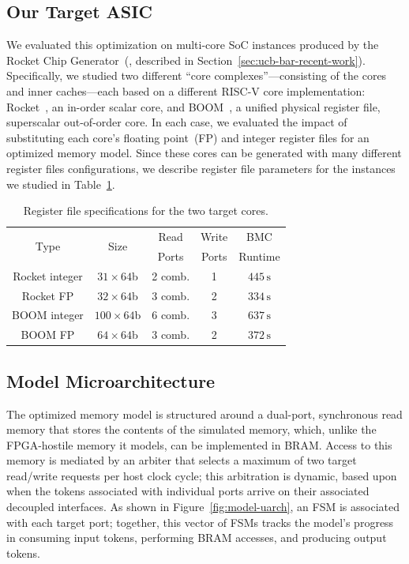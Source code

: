 \subsection{Our Target ASIC}

We evaluated this optimization on  multi-core SoC instances produced by the Rocket Chip
Generator~(\cite{rocketchip}, described in
Section~\ref{sec:ucb-bar-recent-work}). Specifically, we studied two different
``core complexes''---consisting of the cores and inner caches---each based on a different RISC-V core
implementation: Rocket~\cite{rocketchip}, an in-order scalar core, and
BOOM~\cite{BOOM}, a unified physical register file, superscalar out-of-order core.
In each case, we evaluated the impact of substituting each core's floating
point~(FP) and integer register files for an optimized memory model.  Since
these cores can be generated with many different register files
configurations, we describe register file parameters for the instances we studied
in Table~\ref{tbl:regfile-specs}.

\begin{table}[h!]
\centering
\begin{tabular}{c c c c c}
\hline
\multirow{2}{*}{Type} & \multirow{2}{*}{Size} & Read & Write & BMC \\
 & & Ports & Ports & Runtime \\
\hline
Rocket integer & $31 \times 64$b & 2 comb. & 1 & $445\,\text{s}$ \\
Rocket FP & $32 \times 64$b & 3 comb. & 2 & $334\,\text{s}$ \\
BOOM integer & $100 \times 64$b & 6 comb. & 3 & $637\,\text{s}$ \\
BOOM FP & $64 \times 64$b & 3 comb. & 2 & $372\,\text{s}$ \\
\hline
\end{tabular}
    \caption{Register file specifications for the two target cores.}
\label{tbl:regfile-specs}
\end{table}

\vspace*{-5mm}
\subsection{Model Microarchitecture}
\label{sec:case-study:model-uarch}
The optimized memory model is structured around a dual-port, synchronous read memory that stores the
contents of the simulated memory, which, unlike the FPGA-hostile memory it models, can be implemented in BRAM.
Access to this memory
is mediated by an arbiter that selects a maximum of two target read/write requests per host clock
cycle; this arbitration is dynamic, based upon when the tokens associated with individual ports
arrive on their associated decoupled interfaces. As shown in Figure~\ref{fig:model-uarch},
an FSM is associated with each target port; together, this vector of FSMs tracks the
model's progress in consuming input tokens, performing BRAM accesses, and producing output tokens.


